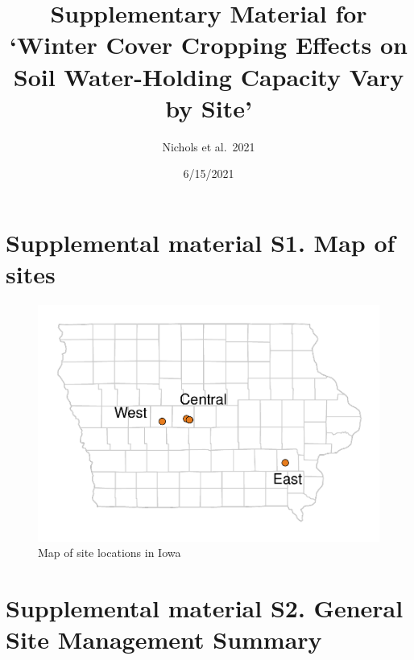 \documentclass[
]{article}
\title{Supplementary Material for `Winter Cover Cropping Effects on Soil
Water-Holding Capacity Vary by Site'}
\author{Nichols et al.~2021}
\date{6/15/2021}
\begin{document}
\maketitle

\hypertarget{supplemental-material-s1.-map-of-sites}{%
\section{Supplemental material S1. Map of
sites}\label{supplemental-material-s1.-map-of-sites}}

\begin{figure}
\centering
\includegraphics{rmd-supp-mat_files/figure-latex/sitemap-1.pdf}
\caption{Map of site locations in Iowa}
\end{figure}

\hypertarget{supplemental-material-s2.-general-site-management-summary}{%
\section{Supplemental material S2. General Site Management
Summary}\label{supplemental-material-s2.-general-site-management-summary}}
\end{document}
